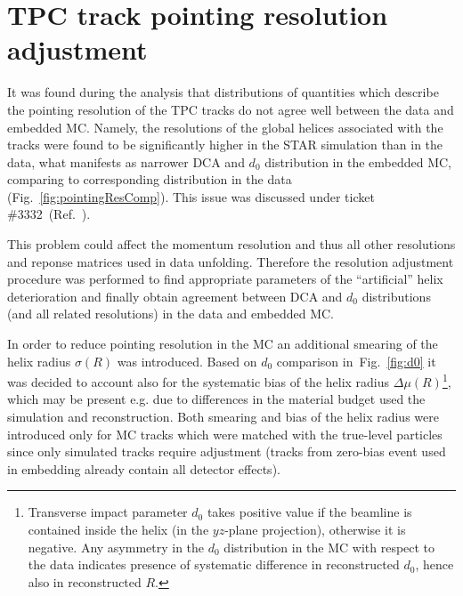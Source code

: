 

\chapter{TPC track pointing resolution adjustment}\label{chap:tpcTrackPointingRes}

It was found during the analysis that distributions of quantities which describe the pointing resolution of the TPC tracks do not agree well between the data and embedded MC. Namely, the resolutions of the global helices associated with the tracks were found to be significantly higher in the STAR simulation than in the data, what manifests as narrower DCA and $d_{0}$ distribution in the embedded MC, comparing to corresponding distribution in the data (Fig.~\ref{fig:pointingResComp}). This issue was discussed under ticket \#3332~(Ref.~\cite{dcaTicket}).

This problem could affect the momentum resolution and thus all other resolutions and reponse matrices used in data unfolding. Therefore the resolution adjustment procedure was performed to find appropriate parameters of the ``artificial'' helix deterioration and finally obtain agreement between DCA and $d_{0}$ distributions (and all related resolutions) in the data and embedded MC.

In order to reduce pointing resolution in the MC an additional smearing of the helix radius $\sigma(R)$ was introduced. Based on $d_{0}$ comparison in~Fig.~\ref{fig:d0} it was decided to account also for the systematic bias of the helix radius $\Delta\mu(R)$\footnote{Transverse impact parameter $d_{0}$ takes positive value if the beamline is contained inside the helix (in the $yz$-plane projection), otherwise it is negative. Any asymmetry in the $d_{0}$ distribution in the MC with respect to the data indicates presence of systematic difference in reconstructed $d_{0}$, hence also in reconstructed $R$.}, which may be present e.g. due to differences in the material budget used the simulation and reconstruction. Both smearing and bias of the helix radius were introduced only for MC tracks which were matched with the true-level particles since only simulated tracks require adjustment (tracks from zero-bias event used in embedding already contain all detector effects).


